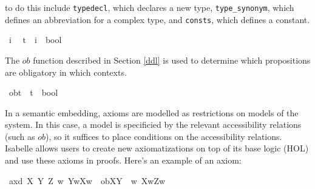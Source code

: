 \begin{isabellebody}
\begin{isamarkuptext}
to do this include \texttt{typedecl}, which declares a new type, \texttt{type\_synonym}, which defines
an abbreviation for a complex type, and \texttt{consts}, which defines a constant.%
\end{isamarkuptext}\isamarkuptrue%
\isamarkupfalse%
\ i\ %
\isanewline
\isanewline
{}\isamarkupfalse%
\ t\ {\isacharequal}\ {\isachardoublequoteopen}{\isacharparenleft}i\ {\isasymRightarrow}\ bool{\isacharparenright}{\isachardoublequoteclose}\ %
\isanewline
%
\isanewline
%
\begin{isamarkuptext}%
The $ob$ function described in Section \ref{ddl} is used to determine which propositions are obligatory
in which contexts.%
\end{isamarkuptext}\isamarkuptrue%
\isamarkupfalse%
\ ob{\isacharcolon}{\isacharcolon}{\isachardoublequoteopen}t\ {\isasymRightarrow}\ {\isacharparenleft}t\ {\isasymRightarrow}\ bool{\isacharparenright}{\isachardoublequoteclose}\ \ %
\isanewline
\ %
\isanewline
%
\isadelimdocument
%
\endisadelimdocument
%
\isatagdocument
%
\isamarkuptrue%
%
\endisatagdocument
{\isafolddocument}%
%
\isadelimdocument
%
\endisadelimdocument
%
\begin{isamarkuptext}%
In a semantic embedding, axioms are modelled as restrictions on models of the system. In this case,
a model is specificied by the relevant accessibility relations (such as $ob$), so it suffices to place conditions on 
the accessibility relations. Isabelle allows users to create new axiomatizations on top of its base
logic (HOL) and use these axioms in proofs. Here's an example of an axiom:%
\end{isamarkuptext}\isamarkuptrue%
\isamarkupfalse%
\ ax{\isacharunderscore}{}d{\isacharcolon}\ {\isachardoublequoteopen}{\isasymforall}X\ Y\ Z{\isachardot}\ {\isacharparenleft}{\isacharparenleft}{\isasymforall}w{\isachardot}\ Y{\isacharparenleft}w{\isacharparenright}{\isasymlongrightarrow}X{\isacharparenleft}w{\isacharparenright}{\isacharparenright}\ {\isasymand}\ ob{\isacharparenleft}X{\isacharparenright}{\isacharparenleft}Y{\isacharparenright}\ {\isasymand}\ {\isacharparenleft}{\isasymforall}w{\isachardot}\ X{\isacharparenleft}w{\isacharparenright}{\isasymlongrightarrow}Z{\isacharparenleft}w{\isacharparenright}{\isacharparenright}{\isacharparenright}\ \isanewline

\end{isabellebody}
